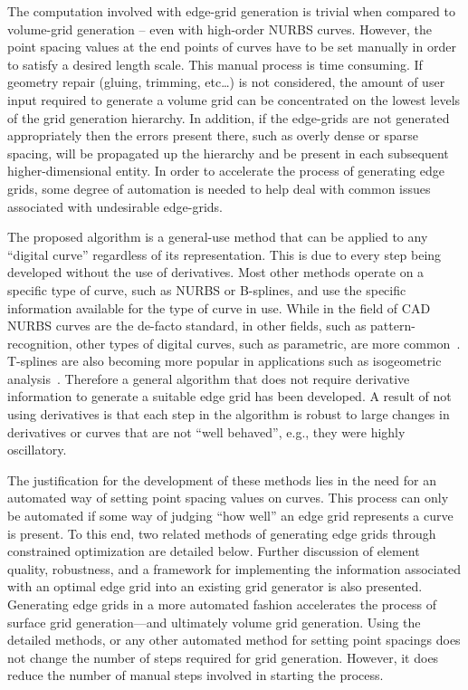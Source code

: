 The computation involved with edge-grid generation is trivial when 
compared to volume-grid generation -- even with high-order NURBS curves. 
However, the point spacing values at the end points of curves have to be set manually in order to satisfy a desired length scale. This manual process is time consuming. If geometry repair (gluing, trimming, etc…) is not considered, the amount of user input required to generate a volume grid can be concentrated on the lowest levels of the grid generation hierarchy. In addition, if the edge-grids are not generated appropriately then the errors present there, such as overly dense or sparse spacing, will be propagated up the hierarchy and be present in each subsequent higher-dimensional entity. In order to accelerate the process of generating edge grids, some degree of automation is needed to help deal with common issues associated with undesirable edge-grids.

The proposed algorithm is a general-use method that can be applied to any 
``digital curve'' regardless of its representation. This is due to every 
step being developed without the use of derivatives. Most other methods 
operate on a specific type of curve, such as NURBS or B-splines, and use 
the specific information available for the type of curve in use. While in 
the field of CAD NURBS curves are the de-facto standard, in other fields, 
such as pattern-recognition, other types of digital curves, such as 
parametric, are more common~\cite{interactive_curve_modeling}.
T-splines are also becoming more 
popular in applications such as isogeometric analysis~\cite{iga}.
Therefore a general algorithm that does not require derivative 
information to generate a suitable edge grid has been developed. A result 
of not using derivatives is that each step in the algorithm is robust to 
large changes in derivatives or curves that are not ``well behaved'', 
e.g., they were highly oscillatory.

The justification for the development of these methods lies in the need for an automated way of setting point spacing values on curves. This process can only be automated if some way of judging ``how well'' an edge grid represents a curve is present. To this end, two related methods of generating edge grids through constrained optimization are detailed below. Further discussion of element quality, robustness, and a framework for implementing the information associated with an optimal edge grid into an existing grid generator is also presented. Generating edge grids in a more automated fashion accelerates the process of surface grid generation---and ultimately volume grid generation. Using the detailed methods, or any other automated method for setting point spacings does not change the number of steps required for grid generation. However, it does reduce the number of manual steps involved in starting the process.

